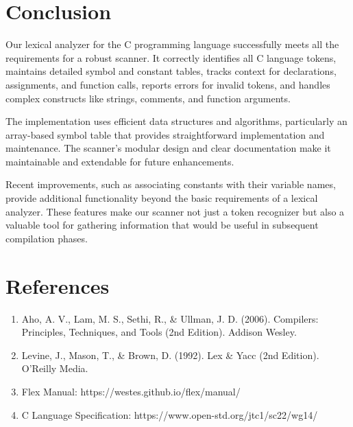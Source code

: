 \documentclass[12pt]{article}
\begin{document}
\section{Conclusion}

Our lexical analyzer for the C programming language successfully meets all the requirements for a robust scanner. It correctly identifies all C language tokens, maintains detailed symbol and constant tables, tracks context for declarations, assignments, and function calls, reports errors for invalid tokens, and handles complex constructs like strings, comments, and function arguments.

The implementation uses efficient data structures and algorithms, particularly an array-based symbol table that provides straightforward implementation and maintenance. The scanner's modular design and clear documentation make it maintainable and extendable for future enhancements.

Recent improvements, such as associating constants with their variable names, provide additional functionality beyond the basic requirements of a lexical analyzer. These features make our scanner not just a token recognizer but also a valuable tool for gathering information that would be useful in subsequent compilation phases.

\section{References}

\begin{enumerate}
    \item Aho, A. V., Lam, M. S., Sethi, R., \& Ullman, J. D. (2006). Compilers: Principles, Techniques, and Tools (2nd Edition). Addison Wesley.
    \item Levine, J., Mason, T., \& Brown, D. (1992). Lex \& Yacc (2nd Edition). O'Reilly Media.
    \item Flex Manual: https://westes.github.io/flex/manual/
    \item C Language Specification: https://www.open-std.org/jtc1/sc22/wg14/
\end{enumerate}
   
    
\end{document}
